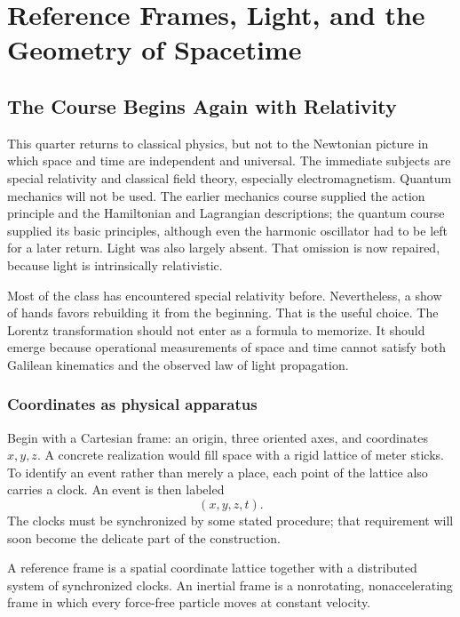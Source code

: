 \chapter{Reference Frames, Light, and the Geometry of Spacetime}

\section{The Course Begins Again with Relativity}

This quarter returns to classical physics, but not to the Newtonian picture in which space and time are independent and universal. The immediate subjects are special relativity and classical field theory, especially electromagnetism. Quantum mechanics will not be used. The earlier mechanics course supplied the action principle and the Hamiltonian and Lagrangian descriptions; the quantum course supplied its basic principles, although even the harmonic oscillator had to be left for a later return. Light was also largely absent. That omission is now repaired, because light is intrinsically relativistic.

Most of the class has encountered special relativity before. Nevertheless, a show of hands favors rebuilding it from the beginning. That is the useful choice. The Lorentz transformation should not enter as a formula to memorize. It should emerge because operational measurements of space and time cannot satisfy both Galilean kinematics and the observed law of light propagation.

\subsection{Coordinates as physical apparatus}

Begin with a Cartesian frame: an origin, three oriented axes, and coordinates \(x,y,z\). A concrete realization would fill space with a rigid lattice of meter sticks. To identify an event rather than merely a place, each point of the lattice also carries a clock. An event is then labeled
\begin{equation}
(x,y,z,t).
\end{equation}
The clocks must be synchronized by some stated procedure; that requirement will soon become the delicate part of the construction.

\begin{definition}
A reference frame is a spatial coordinate lattice together with a distributed system of synchronized clocks. An inertial frame is a nonrotating, nonaccelerating frame in which every force-free particle moves at constant velocity.
\end{definition}

